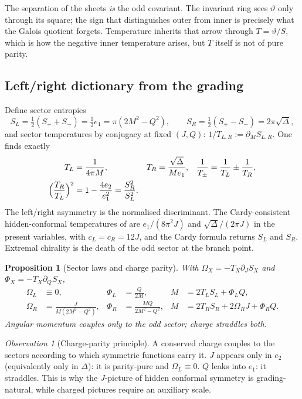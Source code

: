 \documentclass[11pt,a4paper]{article}
\newtheorem{proposition}[theorem]{Proposition}
\theoremstyle{definition}
\theoremstyle{remark}
\newtheorem{observation}[theorem]{Observation}
\newcommand{\disc}{\Delta}
\begin{document}
The separation of the sheets \emph{is} the odd covariant. The invariant ring
sees \(\vartheta\) only through its square; the sign that distinguishes outer
from inner is precisely what the Galois quotient forgets. Temperature inherits
that arrow through \(T=\vartheta/S\), which is how the negative inner
temperature arises, but \(T\) itself is not of pure parity.

\subsection{Left/right dictionary from the grading}

Define sector entropies
\[
S_L=\tfrac12(S_++S_-)=\tfrac12 e_1=\pi(2M^2-Q^2),
\qquad
S_R=\tfrac12(S_+-S_-)=2\pi\sqrt{\disc},
\]
and sector temperatures by conjugacy at fixed \((J,Q)\):
\(1/T_{L,R}:=\partial_M S_{L,R}\). One finds exactly
\begin{align}
T_L&=\frac{1}{4\pi M},&
T_R&=\frac{\sqrt{\disc}}{M e_1},&
\frac{1}{T_\pm}&=\frac{1}{T_L}\pm\frac{1}{T_R},\\
\Bigl(\frac{T_R}{T_L}\Bigr)^2
&=1-\frac{4e_2}{e_1^2}=\frac{S_R^2}{S_L^2}.
\end{align}
The left/right asymmetry is the normalised discriminant. The Cardy-consistent
hidden-conformal temperatures of \cite{WangLiu} are \(e_1/(8\pi^2J)\) and
\(\sqrt{\disc}/(2\pi J)\) in the present variables, with \(c_L=c_R=12J\), and
the Cardy formula returns \(S_L\) and \(S_R\). Extremal chirality
\cite{GHSS} is the death of the odd sector at the branch point.

\begin{proposition}[Sector laws and charge parity]
\label{prop:sectors}
With \(\Omega_X=-T_X\partial_JS_X\) and \(\Phi_X=-T_X\partial_QS_X\),
\begin{align}
\Omega_L&\equiv0,&
\Phi_L&=\frac{Q}{2M},&
M&=2T_LS_L+\Phi_LQ,\\
\Omega_R&=\frac{J}{M(2M^2-Q^2)},&
\Phi_R&=\frac{MQ}{2M^2-Q^2},&
M&=2T_RS_R+2\Omega_RJ+\Phi_RQ.
\end{align}
Angular momentum couples only to the odd sector; charge straddles both.
\end{proposition}

\begin{observation}[Charge-parity principle]
\label{obs:parity}
A conserved charge couples to the sectors according to which symmetric
functions carry it. \(J\) appears only in \(e_2\) (equivalently only in
\(\disc\)): it is parity-pure and \(\Omega_L\equiv0\). \(Q\) leaks into \(e_1\):
it straddles. This is why the \(J\)-picture of hidden conformal symmetry is
grading-natural, while charged pictures require an auxiliary scale.
\end{observation}
\end{document}
